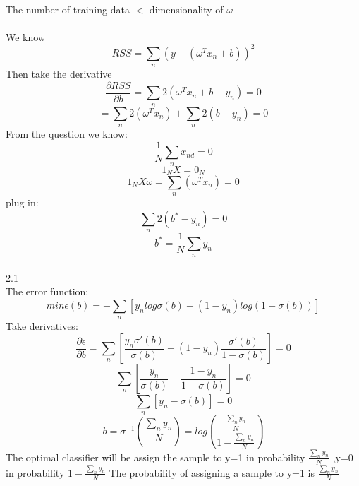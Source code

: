 \documentclass[11pt]{article}
\begin{document}
\\
	 The number of training data $<$ dimensionality of $\omega$\\



\\
	 We know$$RSS=\sum_{n}(y-(\omega^Tx_n+b))^2$$
	 Then take the derivative$$\frac{\partial RSS}{\partial b}=\sum_{n}2(\omega^Tx_n+b-y_n)=0$$                                  
		                                    $$=\sum_{n}2(\omega^Tx_n)+\sum_{n}2(b-y_n)=0$$  
      From the question we know:
	$$\frac{1}{N}\sum_{n}x_{nd}=0$$
	$$1_NX=0_N$$
      $$ 1_NX\omega=\sum_{n}(\omega^Tx_n)=0$$
	plug in:
	$$\sum_{n}2(b^*-y_n)=0$$
      $$b^*=\frac{1}{N}\sum_{n}y_n$$\\
2.1\\
	The error function:
	$$min\epsilon(b)=-\sum_{n} [{y_nlog\sigma(b)+(1-y_n)log(1-\sigma(b))}]$$
	Take derivatives:
	$$\frac{\partial{\epsilon}}{\partial{b}}=\sum_{n}[\frac{y_n\sigma'(b)}{\sigma(b)}-(1-y_n)\frac{\sigma'(b)}{1-\sigma(b)}]=0$$
	$$\sum_n[\frac{y_n}{\sigma(b)}-\frac{1-y_n}{1-\sigma(b)}]=0$$
	$$\sum_n[y_n-\sigma(b)]=0$$
	$$b=\sigma^{-1}(\frac{\sum_{n}{y_n}}{N})=log(\frac{\frac{\sum_{n}{y_n}}{N}}{1-\frac{\sum_{n}{y_n}}{N}})$$
	The optimal classifier will be assign the sample to y=1 in probability $\frac{\sum_{n}{y_n}}{N}$ ,y=0 in probability $1-\frac{\sum_{n}{y_n}}{N}$
	The probability of assigning a sample to y=1 is $\frac{\sum_{n}{y_n}}{N}$
\end{document}
